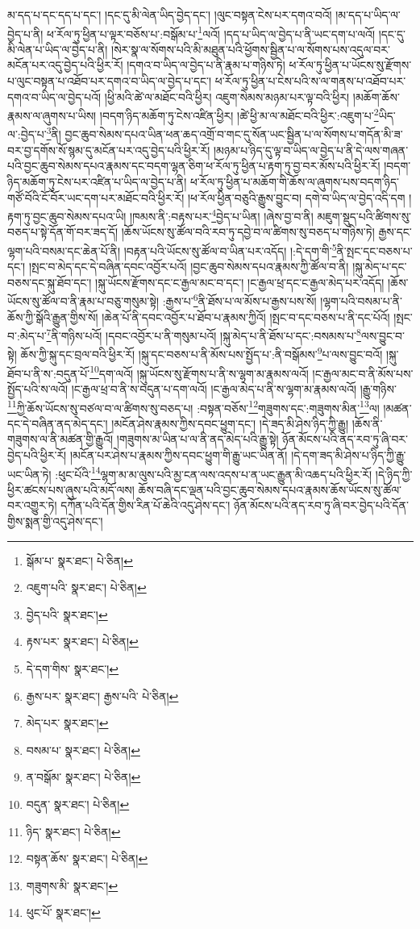 མ་དད་པ་དང་དད་པ་དང་། །དང་དུ་མི་ལེན་ཡིད་བྱེད་དང་། །ལུང་བསྟན་ངེས་པར་དགའ་བའོ། །མ་དད་པ་ཡིད་ལ་བྱེད་པ་ནི། ཕ་རོལ་ཏུ་ཕྱིན་པ་ལྟར་བཅོས་པ་:བསྒོམ་པ་\footnote{སྒོམ་པ་  སྣར་ཐང་།  པེ་ཅིན། }ལའོ། །དད་པ་ཡིད་ལ་བྱེད་པ་ནི་ཡང་དག་པ་ལའོ། །དང་དུ་མི་ལེན་པ་ཡིད་ལ་བྱེད་པ་ནི། །སེར་སྣ་ལ་སོགས་པའི་མི་མཐུན་པའི་ཕྱོགས་སྦྱིན་པ་ལ་སོགས་པས་འདུལ་བར་མངོན་པར་འདུ་བྱེད་པའི་ཕྱིར་རོ། །དགའ་བ་ཡིད་ལ་བྱེད་པ་ནི་རྣམ་པ་གཉིས་ཏེ། ཕ་རོལ་ཏུ་ཕྱིན་པ་ཡོངས་སུ་རྫོགས་པ་ལུང་བསྟན་པ་འཐོབ་པར་དགའ་བ་ཡིད་ལ་བྱེད་པ་དང་། ཕ་རོལ་ཏུ་ཕྱིན་པ་ངེས་པའི་ས་ལ་གནས་པ་འཐོབ་པར་དགའ་བ་ཡིད་ལ་བྱེད་པའོ། །ཕྱི་མའི་ཚེ་ལ་མཐོང་བའི་ཕྱིར། འཇུག་སེམས་མཉམ་པར་ལྟ་བའི་ཕྱིར། །མཆོག་ཆོས་རྣམས་ལ་ཞུགས་པ་ཡིས། །བདག་ཉིད་མཆོག་ཏུ་ངེས་འཛིན་ཕྱིར། །ཚེ་ཕྱི་མ་ལ་མཐོང་བའི་ཕྱིར་:འཇུག་པ་\footnote{འཇུག་པའི་  སྣར་ཐང་།  པེ་ཅིན། }ཡིད་ལ་:བྱེད་པ་\footnote{བྱེད་པའི་  སྣར་ཐང་། }ནི། བྱང་ཆུབ་སེམས་དཔའ་ཡིན་ཕན་ཆད་འགྲོ་བ་གང་དུ་སོན་ཡང་སྦྱིན་པ་ལ་སོགས་པ་གདོན་མི་ཟ་བར་བྱ་དགོས་སོ་སྙམ་དུ་མངོན་པར་འདུ་བྱེད་པའི་ཕྱིར་རོ། །མཉམ་པ་ཉིད་དུ་ལྟ་བ་ཡིད་ལ་བྱེད་པ་ནི་དེ་ལས་གཞན་པའི་བྱང་ཆུབ་སེམས་དཔའ་རྣམས་དང་བདག་ལྷན་ཅིག་ཕ་རོལ་ཏུ་ཕྱིན་པ་རྟག་ཏུ་བྱ་བར་མོས་པའི་ཕྱིར་རོ། །བདག་ཉིད་མཆོག་ཏུ་ངེས་པར་འཛིན་པ་ཡིད་ལ་བྱེད་པ་ནི། ཕ་རོལ་ཏུ་ཕྱིན་པ་མཆོག་གི་ཆོས་ལ་ཞུགས་པས་བདག་ཉིད་གཙོ་བོའི་ངོ་བོར་ཡང་དག་པར་མཐོང་བའི་ཕྱིར་རོ། །ཕ་རོལ་ཕྱིན་བཅུའི་རྒྱུས་བྱུང་བ། དགེ་བ་ཡིད་ལ་བྱེད་འདི་དག །རྟག་ཏུ་བྱང་ཆུབ་སེམས་དཔའ་ཡི། །ཁམས་ནི་:བརྟས་པར་\footnote{རྟས་པར་  སྣར་ཐང་།  པེ་ཅིན། }བྱེད་པ་ཡིན། །ཞེས་བྱ་བ་ནི། མཇུག་སྡུད་པའི་ཚིགས་སུ་བཅད་པ་སྟེ་དོན་གོ་བར་ཟད་དོ། །ཆོས་ཡོངས་སུ་ཚོལ་བའི་རབ་ཏུ་དབྱེ་བ་ལ་ཚིགས་སུ་བཅད་པ་གཉིས་ཏེ། རྒྱས་དང་ལྷག་པའི་བསམ་དང་ཆེན་པོ་ནི། །བརྟན་པའི་ཡོངས་སུ་ཚོལ་བ་ཡིན་པར་འདོད། །:དེ་དག་གི་\footnote{དེ་དག་གིས་  སྣར་ཐང་། }ནི་སྤང་དང་བཅས་པ་དང་། །སྤང་བ་མེད་དང་དེ་བཞིན་དབང་འབྱོར་པའོ། །བྱང་ཆུབ་སེམས་དཔའ་རྣམས་ཀྱི་ཚོལ་བ་ནི། །སྐུ་མེད་པ་དང་བཅས་དང་སྐུ་ཐོབ་དང་། །སྐུ་ཡོངས་རྫོགས་དང་ང་རྒྱལ་མང་བ་དང་། །ང་རྒྱལ་ཕྲ་དང་ང་རྒྱལ་མེད་པར་འདོད། །ཆོས་ཡོངས་སུ་ཚོལ་བ་ནི་རྣམ་པ་བཅུ་གསུམ་སྟེ། :རྒྱས་པ་\footnote{རྒྱས་པར་  སྣར་ཐང་། རྒྱས་པའི་  པེ་ཅིན། }ནི་ཐོས་པ་ལ་མོས་པ་རྒྱས་པས་སོ། །ལྷག་པའི་བསམ་པ་ནི་ཆོས་ཀྱི་སྒོའི་རྒྱུན་གྱིས་སོ། །ཆེན་པོ་ནི་དབང་འབྱོར་པ་ཐོབ་པ་རྣམས་ཀྱིའོ། །སྤང་བ་དང་བཅས་པ་ནི་དང་པོའོ། །སྤང་བ་:མེད་པ་\footnote{མེད་པར་  སྣར་ཐང་། }ནི་གཉིས་པའོ། །དབང་འབྱོར་པ་ནི་གསུམ་པའོ། །སྐུ་མེད་པ་ནི་ཐོས་པ་དང་:བསམས་པ་\footnote{བསམ་པ་  སྣར་ཐང་།  པེ་ཅིན། }ལས་བྱུང་བ་སྟེ། ཆོས་ཀྱི་སྐུ་དང་བྲལ་བའི་ཕྱིར་རོ། །སྐུ་དང་བཅས་པ་ནི་མོས་པས་སྤྱོད་པ་:ནི་བསྒོམས་\footnote{ན་བསྒོམ་  སྣར་ཐང་།  པེ་ཅིན། }པ་ལས་བྱུང་བའོ། །སྐུ་ཐོབ་པ་ནི་ས་:བདུན་པོ་\footnote{བདུན་  སྣར་ཐང་།  པེ་ཅིན། }དག་ལའོ། །སྐུ་ཡོངས་སུ་རྫོགས་པ་ནི་ས་ལྷག་མ་རྣམས་ལའོ། །ང་རྒྱལ་མང་བ་ནི་མོས་པས་སྤྱོད་པའི་ས་ལའོ། །ང་རྒྱལ་ཕྲ་བ་ནི་ས་བདུན་པ་དག་ལའོ། །ང་རྒྱལ་མེད་པ་ནི་ས་ལྷག་མ་རྣམས་ལའོ། །རྒྱུ་གཉིས་\footnote{ཉིད་  སྣར་ཐང་།  པེ་ཅིན། }ཀྱི་ཆོས་ཡོངས་སུ་བཙལ་བ་ལ་ཚིགས་སུ་བཅད་པ། :བསྟན་བཅོས་\footnote{བསྟན་ཆོས་  སྣར་ཐང་།  པེ་ཅིན། }གཟུགས་དང་:གཟུགས་མིན་\footnote{གཟུགས་མི་  སྣར་ཐང་། }ལ། །མཚན་དང་དེ་བཞིན་ནད་མེད་དང་། །མངོན་ཤེས་རྣམས་ཀྱིས་དབང་ཕྱུག་དང་། །དེ་ཟད་མི་ཤེས་ཉིད་ཀྱི་རྒྱུ། །ཆོས་ནི་གཟུགས་ལ་ནི་མཚན་གྱི་རྒྱུའོ། །གཟུགས་མ་ཡིན་པ་ལ་ནི་ནད་མེད་པའི་རྒྱུ་སྟེ། ཉོན་མོངས་པའི་ནད་རབ་ཏུ་ཞི་བར་བྱེད་པའི་ཕྱིར་རོ། །མངོན་པར་ཤེས་པ་རྣམས་ཀྱིས་དབང་ཕྱུག་གི་རྒྱུ་ཡང་ཡིན་ནོ། །དེ་དག་ཟད་མི་ཤེས་པ་ཉིད་ཀྱི་རྒྱུ་ཡང་ཡིན་ཏེ། :ཕུང་པོའི་\footnote{ཕུང་པོ་  སྣར་ཐང་། }ལྷག་མ་མ་ལུས་པའི་མྱ་ངན་ལས་འདས་པ་ན་ཡང་རྒྱུན་མི་འཆད་པའི་ཕྱིར་རོ། །དེ་ཉིད་ཀྱི་ཕྱིར་ཚངས་པས་ཞུས་པའི་མདོ་ལས། ཆོས་བཞི་དང་ལྡན་པའི་བྱང་ཆུབ་སེམས་དཔའ་རྣམས་ཆོས་ཡོངས་སུ་ཚོལ་བར་འགྱུར་ཏེ། དཀོན་པའི་དོན་གྱིས་རིན་པོ་ཆེའི་འདུ་ཤེས་དང་། ཉོན་མོངས་པའི་ནད་རབ་ཏུ་ཞི་བར་བྱེད་པའི་དོན་གྱིས་སྨན་གྱི་འདུ་ཤེས་དང་། 
